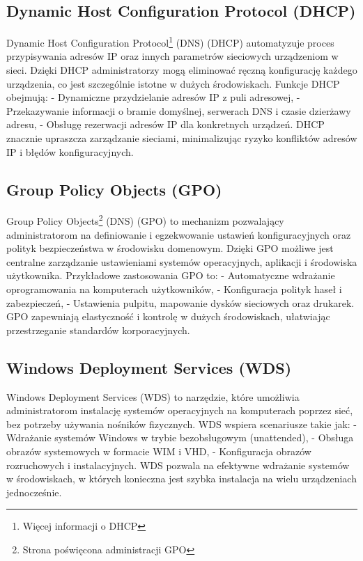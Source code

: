 \subsection{Dynamic Host Configuration Protocol (DHCP)}
Dynamic Host Configuration Protocol\footnote{Więcej informacji o DHCP\cite{dhcp}} (DNS) (DHCP) automatyzuje proces przypisywania adresów IP oraz innych parametrów sieciowych urządzeniom w sieci. Dzięki DHCP administratorzy mogą eliminować ręczną konfigurację każdego urządzenia, co jest szczególnie istotne w dużych środowiskach. Funkcje DHCP obejmują:
- Dynamiczne przydzielanie adresów IP z puli adresowej,
- Przekazywanie informacji o bramie domyślnej, serwerach DNS i czasie dzierżawy adresu,
- Obsługę rezerwacji adresów IP dla konkretnych urządzeń.
DHCP znacznie upraszcza zarządzanie sieciami, minimalizując ryzyko konfliktów adresów IP i błędów konfiguracyjnych.

\subsection{Group Policy Objects (GPO)}
Group Policy Objects\footnote{Strona poświęcona administracji GPO\cite{gpo}} (DNS) (GPO) to mechanizm pozwalający administratorom na definiowanie i egzekwowanie ustawień konfiguracyjnych oraz polityk bezpieczeństwa w środowisku domenowym. Dzięki GPO możliwe jest centralne zarządzanie ustawieniami systemów operacyjnych, aplikacji i środowiska użytkownika. Przykładowe zastosowania GPO to:
- Automatyczne wdrażanie oprogramowania na komputerach użytkowników,
- Konfiguracja polityk haseł i zabezpieczeń,
- Ustawienia pulpitu, mapowanie dysków sieciowych oraz drukarek.
GPO zapewniają elastyczność i kontrolę w dużych środowiskach, ułatwiając przestrzeganie standardów korporacyjnych.

\subsection{Windows Deployment Services (WDS)}
Windows Deployment Services (WDS) to narzędzie, które umożliwia administratorom instalację systemów operacyjnych na komputerach poprzez sieć, bez potrzeby używania nośników fizycznych. WDS wspiera scenariusze takie jak:
- Wdrażanie systemów Windows w trybie bezobsługowym (unattended),
- Obsługa obrazów systemowych w formacie WIM i VHD,
- Konfiguracja obrazów rozruchowych i instalacyjnych.
WDS pozwala na efektywne wdrażanie systemów w środowiskach, w których konieczna jest szybka instalacja na wielu urządzeniach jednocześnie.

